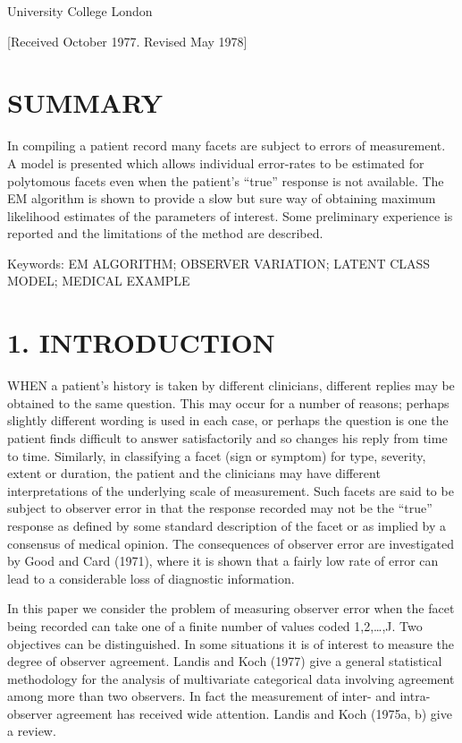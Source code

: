 \documentclass[
]{article}
\begin{document}
University College London

{[}Received October 1977. Revised May 1978{]}

\section{SUMMARY}\label{summary}

In compiling a patient record many facets are subject to errors of
measurement. A model is presented which allows individual error-rates to
be estimated for polytomous facets even when the patient's ``true''
response is not available. The EM algorithm is shown to provide a slow
but sure way of obtaining maximum likelihood estimates of the parameters
of interest. Some preliminary experience is reported and the limitations
of the method are described.

Keywords: EM ALGORITHM; OBSERVER VARIATION; LATENT CLASS MODEL; MEDICAL
EXAMPLE

\section{1. INTRODUCTION}\label{introduction}

WHEN a patient's history is taken by different clinicians, different
replies may be obtained to the same question. This may occur for a
number of reasons; perhaps slightly different wording is used in each
case, or perhaps the question is one the patient finds difficult to
answer satisfactorily and so changes his reply from time to time.
Similarly, in classifying a facet (sign or symptom) for type, severity,
extent or duration, the patient and the clinicians may have different
interpretations of the underlying scale of measurement. Such facets are
said to be subject to observer error in that the response recorded may
not be the ``true'' response as defined by some standard description of
the facet or as implied by a consensus of medical opinion. The
consequences of observer error are investigated by Good and Card (1971),
where it is shown that a fairly low rate of error can lead to a
considerable loss of diagnostic information.

In this paper we consider the problem of measuring observer error when
the facet being recorded can take one of a finite number of values coded
1,2,\ldots,J. Two objectives can be distinguished. In some situations it
is of interest to measure the degree of observer agreement. Landis and
Koch (1977) give a general statistical methodology for the analysis of
multivariate categorical data involving agreement among more than two
observers. In fact the measurement of inter- and intra-observer
agreement has received wide attention. Landis and Koch (1975a, b) give a
review.
\end{document}
